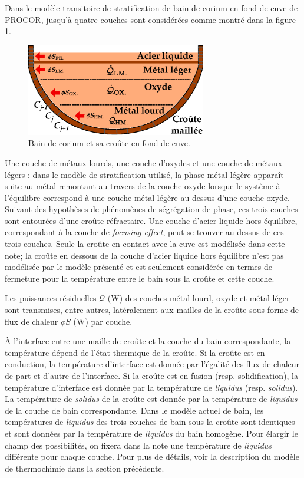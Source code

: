 Dans le modèle transitoire de stratification de bain de corium en fond de cuve de PROCOR, jusqu'à quatre couches sont considérées comme montré dans la figure \ref{fig:bain_corium_croute}. 
\begin{figure}
\centering
\includegraphics[width=0.7\textwidth, keepaspectratio=true]{Figures/bain_corium_croute.eps}
\caption{Bain de corium et sa croûte en fond de cuve.}
\label{fig:bain_corium_croute}
\end{figure}
Une couche de métaux lourds, une couche d'oxydes et une couche de métaux légers : dans le modèle de stratification utilisé, la phase métal légère apparaît suite au métal remontant au travers de la couche oxyde lorsque le système à l'équilibre correspond à une couche métal légère au dessus d'une couche oxyde. Suivant des hypothèses de phénomènes de ségrégation de phase, ces trois couches sont entourées d'une croûte réfractaire. Une couche d'acier liquide hors équilibre, correspondant à la couche de \textit{focusing effect}, peut se trouver au dessus de ces trois couches. Seule la croûte en contact avec la cuve est modélisée dans cette note; la croûte en dessous de la couche d'acier liquide hors équilibre n'est pas modélisée par le modèle présenté et est seulement considérée en termes de fermeture pour la température entre le bain sous la croûte et cette couche. 

Les puissances résiduelles $\dot{\mathcal{Q}}$ (W) des couches métal lourd, oxyde et métal léger sont transmises, entre autres, latéralement aux mailles de la croûte sous forme de flux de chaleur $\phi S$ (W) par couche.

À l'interface entre une maille de croûte et la couche du bain correspondante, la température dépend de l'état thermique de la croûte. Si la croûte est en conduction, la température d'interface est donnée par l'égalité des flux de chaleur de part et d'autre de l'interface. Si la croûte est en fusion (resp. solidification), la température d'interface est donnée par la température de \textit{liquidus} (resp. \textit{solidus}). La température de \textit{solidus} de la croûte est donnée par la température de \textit{liquidus} de la couche de bain correspondante. Dans le modèle actuel de bain, les températures de \textit{liquidus} des trois couches de bain sous la croûte sont identiques et sont données par la température de \textit{liquidus} du bain homogène. Pour élargir le champ des possibilités, on fixera dans la note une température de \textit{liquidus} différente pour chaque couche. Pour plus de détails, voir la description du modèle de thermochimie dans la section précédente. 

